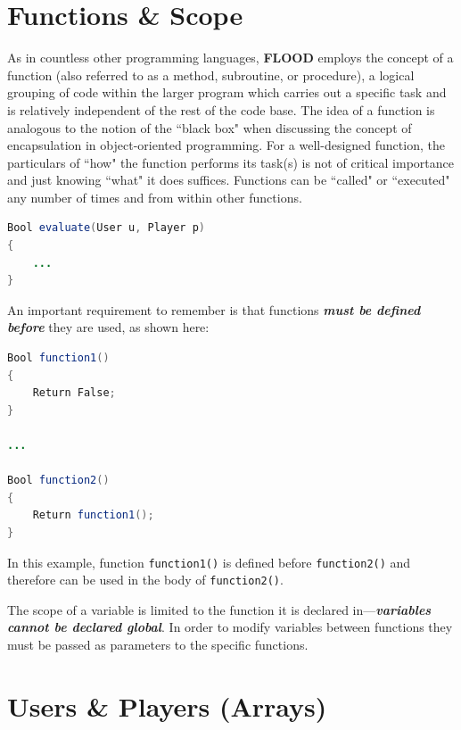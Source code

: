 \documentclass[12pt]{report}
\begin{document}
\section{Functions \& Scope}

As in countless other programming languages, \textbf{FLOOD} employs the concept of a function (also referred to as a method, subroutine, or procedure), a logical grouping of code within the larger program which carries out a specific task and is relatively independent of the rest of the code base. The idea of a function is analogous to the notion of the ``black box" when discussing the concept of encapsulation in object-oriented programming. For a well-designed function, the particulars of ``how" the function performs its task(s) is not of critical importance and just knowing ``what" it does suffices. Functions can be ``called" or ``executed" any number of times and from within other functions. 

\begin{singlespace}
\begin{lstlisting}[language=Java,label=some-code,caption={Syntax of a FLOOD function.}]
Bool evaluate(User u, Player p)
{
	...
} 
\end{lstlisting}
\end{singlespace}

An important requirement to remember is that functions \textit{\textbf{must be defined before}} they are used, as shown here:

\begin{singlespace}
\begin{lstlisting}[language=Java,label=some-code,caption={A function must be defined before being called.}]
Bool function1()
{
	Return False;
} 

...

Bool function2()
{
	Return function1();
} 
\end{lstlisting}
\end{singlespace}

In this example, function \texttt{function1()} is defined before \texttt{function2()} and therefore can be used in the body of \texttt{function2()}. 

The scope of a variable is limited to the function it is declared in---\textit{\textbf{variables cannot be declared global}}. In order to modify variables between functions they must be passed as parameters to the specific functions.

\section{Users \& Players (Arrays)}
\end{document}
